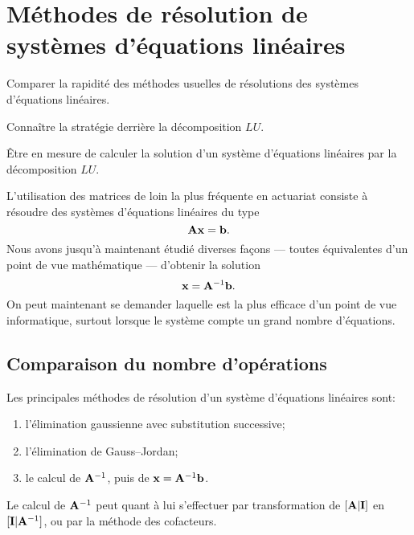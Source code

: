 \chapter{Méthodes de résolution de systèmes d'équations linéaires}
\label{chap:decomposition}

\begin{objectifs}
\item Comparer la rapidité des méthodes usuelles de résolutions des
  systèmes d’équations linéaires.
\item Connaître la stratégie derrière la décomposition $LU$.
\item Être en mesure de calculer la solution d’un
  système d’équations linéaires par la décomposition $LU$.
\end{objectifs}

L'utilisation des matrices de loin la plus fréquente en actuariat
consiste à résoudre des systèmes d'équations linéaires du type
\begin{displaymath}
  \mathbf{A} \mathbf{x} = \mathbf{b}.
\end{displaymath}
Nous avons jusqu'à maintenant étudié diverses façons --- toutes
équivalentes d'un point de vue mathématique --- d'obtenir la solution
\begin{displaymath}
  \mathbf{x} = \mathbf{A}^{-1} \mathbf{b}.
\end{displaymath}
On peut maintenant se demander laquelle est la plus efficace d'un
point de vue informatique, surtout lorsque le système compte un grand
nombre d'équations.


\section{Comparaison du nombre d'opérations}
\label{sec:decomposition:nombre_operations}

Les principales méthodes de résolution d'un système d'équations
linéaires sont:
\begin{enumerate}
\item l'élimination gaussienne avec substitution successive;
\item l'élimination de Gauss--Jordan;
\item le calcul de $\mathbf{A}^{-1}$, puis de $\mathbf{x} = \mathbf{A}^{-1}
  \mathbf{b}$.
\end{enumerate}
Le calcul de $\mathbf{A}^{-1}$ peut quant à lui s'effectuer par
transformation de $[\mathbf{A}|\mathbf{I}]$ en $[\mathbf{I}|\mathbf{A}^{-1}]$, ou
par la méthode des cofacteurs.


